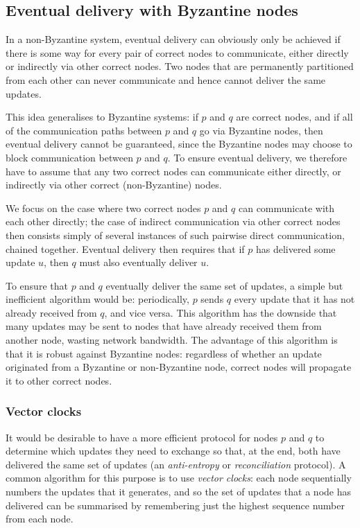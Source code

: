 \documentclass[sigplan,review]{acmart}
\begin{document}
\subsection{Eventual delivery with Byzantine nodes}\label{sec:delivery}

In a non-Byzantine system, eventual delivery can obviously only be achieved if there is some way for every pair of correct nodes to communicate, either directly or indirectly via other correct nodes.
Two nodes that are permanently partitioned from each other can never communicate and hence cannot deliver the same updates.

This idea generalises to Byzantine systems: if $p$ and $q$ are correct nodes, and if all of the communication paths between $p$ and $q$ go via Byzantine nodes, then eventual delivery cannot be guaranteed, since the Byzantine nodes may choose to block communication between $p$ and $q$.
To ensure eventual delivery, we therefore have to assume that any two correct nodes can communicate either directly, or indirectly via other correct (non-Byzantine) nodes.

We focus on the case where two correct nodes $p$ and $q$ can communicate with each other directly; the case of indirect communication via other correct nodes then consists simply of several instances of such pairwise direct communication, chained together.
Eventual delivery then requires that if $p$ has delivered some update $u$, then $q$ must also eventually deliver $u$.

To ensure that $p$ and $q$ eventually deliver the same set of updates, a simple but inefficient algorithm would be: periodically, $p$ sends $q$ every update that it has not already received from $q$, and vice versa.
This algorithm has the downside that many updates may be sent to nodes that have already received them from another node, wasting network bandwidth.
The advantage of this algorithm is that it is robust against Byzantine nodes: regardless of whether an update originated from a Byzantine or non-Byzantine node, correct nodes will propagate it to other correct nodes.

\subsubsection{Vector clocks}\label{sec:vector-clocks}

It would be desirable to have a more efficient protocol for nodes $p$ and $q$ to determine which updates they need to exchange so that, at the end, both have delivered the same set of updates (an \emph{anti-entropy} or \emph{reconciliation} protocol).
A common algorithm for this purpose is to use \emph{vector clocks}: each node sequentially numbers the updates that it generates, and so the set of updates that a node has delivered can be summarised by remembering just the highest sequence number from each node.
\end{document}
